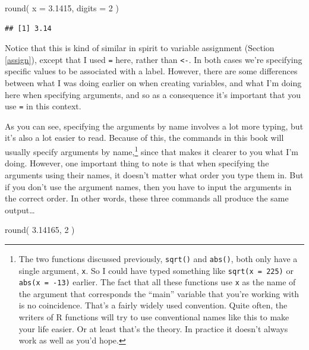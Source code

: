 \documentclass[
]{book}
\newenvironment{Shaded}{\begin{snugshade}}{\end{snugshade}}
\newcommand{\AttributeTok}[1]{\textcolor[rgb]{0.77,0.63,0.00}{#1}}
\newcommand{\DecValTok}[1]{\textcolor[rgb]{0.00,0.00,0.81}{#1}}
\newcommand{\FloatTok}[1]{\textcolor[rgb]{0.00,0.00,0.81}{#1}}
\newcommand{\FunctionTok}[1]{\textcolor[rgb]{0.00,0.00,0.00}{#1}}
\newcommand{\NormalTok}[1]{#1}
\begin{document}
\begin{Shaded}
\begin{Highlighting}[]
\FunctionTok{round}\NormalTok{( }\AttributeTok{x =} \FloatTok{3.1415}\NormalTok{, }\AttributeTok{digits =} \DecValTok{2}\NormalTok{ )}
\end{Highlighting}
\end{Shaded}

\begin{verbatim}
## [1] 3.14
\end{verbatim}

Notice that this is kind of similar in spirit to variable assignment (Section \ref{assign}), except that I used \texttt{=} here, rather than \texttt{\textless{}-}. In both cases we're specifying specific values to be associated with a label. However, there are some differences between what I was doing earlier on when creating variables, and what I'm doing here when specifying arguments, and so as a consequence it's important that you use \texttt{=} in this context.

As you can see, specifying the arguments by name involves a lot more typing, but it's also a lot easier to read. Because of this, the commands in this book will usually specify arguments by name,\footnote{The two functions discussed previously, \texttt{sqrt()} and \texttt{abs()}, both only have a single argument, \texttt{x}. So I could have typed something like \texttt{sqrt(x\ =\ 225)} or \texttt{abs(x\ =\ -13)} earlier. The fact that all these functions use \texttt{x} as the name of the argument that corresponds the ``main'' variable that you're working with is no coincidence. That's a fairly widely used convention. Quite often, the writers of R functions will try to use conventional names like this to make your life easier. Or at least that's the theory. In practice it doesn't always work as well as you'd hope.} since that makes it clearer to you what I'm doing. However, one important thing to note is that when specifying the arguments using their names, it doesn't matter what order you type them in. But if you don't use the argument names, then you have to input the arguments in the correct order. In other words, these three commands all produce the same output\ldots{}

\begin{Shaded}
\begin{Highlighting}[]
\FunctionTok{round}\NormalTok{( }\FloatTok{3.14165}\NormalTok{, }\DecValTok{2}\NormalTok{ )}
\end{Highlighting}
\end{Shaded}
\end{document}
